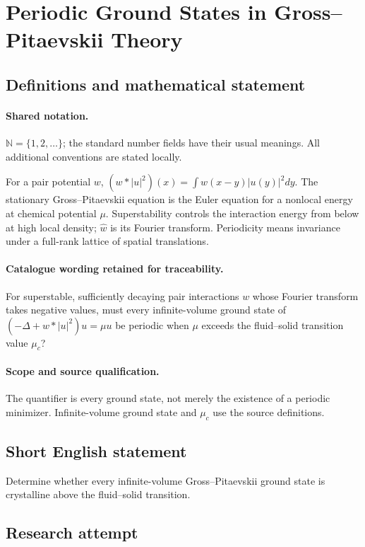 \documentclass[11pt]{article}
\begin{document}
\section{Periodic Ground States in Gross–Pitaevskii Theory}\label{statement}

\subsection{Definitions and mathematical statement}

\paragraph{Shared notation.}$\mathbb N=\{1,2,\ldots\}$; the standard number fields have their usual meanings. All additional conventions are stated locally.


For a pair potential $w$, $(w*|u|^2)(x)=\int w(x-y)|u(y)|^2dy$. The stationary Gross--Pitaevskii equation is the Euler equation for a nonlocal energy at chemical potential $\mu$. Superstability controls the interaction energy from below at high local density; $\widehat w$ is its Fourier transform. Periodicity means invariance under a full-rank lattice of spatial translations.

\paragraph{Catalogue wording retained for traceability.}
For superstable, sufficiently decaying pair interactions $w$ whose Fourier transform takes negative values, must every infinite-volume ground state of $(-\Delta+w*|u|^2)u=\mu u$ be periodic when $\mu$ exceeds the fluid–solid transition value $\mu_c$?

\paragraph{Scope and source qualification.}The quantifier is every ground state, not merely the existence of a periodic minimizer. Infinite-volume ground state and $\mu_c$ use the source definitions.
\subsection{Short English statement}
Determine whether every infinite-volume Gross--Pitaevskii ground state is crystalline above the fluid--solid transition.
\subsection{Research attempt}
\end{document}
